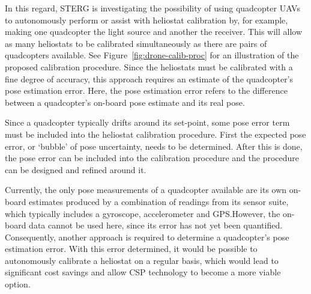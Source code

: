 In this regard, STERG is investigating the possibility of using quadcopter UAVs to autonomously perform or assist with heliostat calibration by, for example, making one quadcopter the light source and another the receiver. This will allow as many heliostats to be calibrated simultaneously as there are pairs of quadcopters available. See Figure~\ref{fig:drone-calib-proc} for an illustration of the proposed calibration procedure. Since the heliostats must be calibrated with a fine degree of accuracy, this approach requires an estimate of the quadcopter's pose estimation error. Here, the pose estimation error refers to the difference between a quadcopter's on-board pose estimate and its real pose.

Since a quadcopter typically drifts around its set-point, some pose error term must be included into the heliostat calibration procedure. First the expected pose error, or `bubble' of pose uncertainty, needs to be determined. After this is done, the pose error can be included into the calibration procedure and the procedure can be designed and refined around it.

Currently, the only pose measurements of a quadcopter available are its own on-board estimates produced by a combination of readings from its sensor suite, which typically includes a gyroscope, accelerometer and GPS.\@ However, the on-board data cannot be used here, since its error has not yet been quantified. Consequently, another approach is required to determine a quadcopter's pose estimation error. With this error determined, it would be possible to autonomously calibrate a heliostat on a regular basis, which would lead to significant cost savings and allow CSP technology to become a more viable option.  




